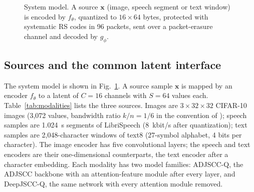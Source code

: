 \documentclass[journal]{IEEEtran}
\begin{document}
\begin{figure}[t]\centering
{}
\caption{System model. A source $\mathbf{x}$ (image, speech segment or text window) is encoded by
$f_\theta$, quantized to $16\times64$ bytes, protected with systematic RS codes in 96 packets, sent over a
packet-erasure channel and decoded by $g_\phi$.}
\label{fig:system}
\end{figure}

\subsection{Sources and the common latent interface}
The system model is shown in Fig.~\ref{fig:system}. A source sample $\mathbf{x}$ is mapped by an encoder
$f_\theta$ to a latent of $C=16$ channels with $S=64$ values each. Table~\ref{tab:modalities} lists the
three sources. Images are $3\times32\times32$ CIFAR-10 images \cite{krizhevsky2009cifar} (3,072 values,
bandwidth ratio $k/n=1/6$ in the convention of \cite{bourtsoulatze2019deep}); speech samples are
1.024~s segments of LibriSpeech \cite{panayotov2015librispeech} (8~kbit/s after quantization); text
samples are 2,048-character windows of text8 \cite{mahoney2011text8} (27-symbol alphabet, 4 bits per
character). The image encoder has five convolutional layers; the speech and text encoders are their
one-dimensional counterparts, the text encoder after a character embedding. Each modality has two model
families: ADJSCC-Q, the ADJSCC backbone \cite{xu2022adjscc} with an attention-feature module after every
layer, and DeepJSCC-Q, the same network with every attention module removed.
\end{document}
